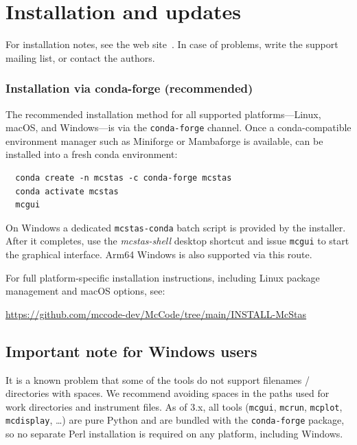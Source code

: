 \section{Installation and updates}
\label{s:install}

For installation notes, see the web site~\cite{mcstas_webpage}.
In case of problems, write the support mailing list,
or contact the authors.

\subsubsection{Installation via conda-forge (recommended)}
\label{s:install-conda}

The recommended installation method for all supported platforms---Linux,
macOS, and Windows---is via the \texttt{conda-forge} channel.  Once a
conda-compatible environment manager such as Miniforge or Mambaforge is
available, \MCS can be installed into a fresh conda environment:

\begin{verbatim}
  conda create -n mcstas -c conda-forge mcstas
  conda activate mcstas
  mcgui
\end{verbatim}

On Windows a dedicated \texttt{mcstas-conda} batch script is provided by
the installer.  After it completes, use the \emph{mcstas-shell} desktop
shortcut and issue \texttt{mcgui} to start the graphical interface.
Arm64 Windows is also supported via this route.

For full platform-specific installation instructions, including Linux
package management and macOS options, see:
\begin{center}
  \url{https://github.com/mccode-dev/McCode/tree/main/INSTALL-McStas}
\end{center}

\subsection{Important note for Windows users} 
It is a known problem that some of
the \MCS tools do not support filenames / directories with spaces.
We recommend avoiding spaces in the paths used for \MCS work directories
and instrument files. As of \MCS 3.x, all tools (\texttt{mcgui}, \texttt{mcrun},
\texttt{mcplot}, \texttt{mcdisplay}, \ldots) are pure Python and are bundled
with the \texttt{conda-forge} package, so no separate Perl installation is
required on any platform, including Windows.

